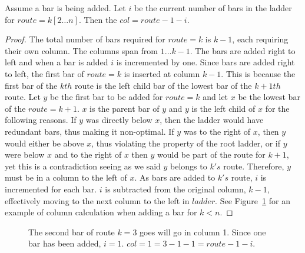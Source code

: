 \begin{lemma}
  Assume a bar is being added. Let $i$ be the current number of bars in the ladder for $route=k[2 \dots n]$.
  Then the $col=route-1-i$.
\end{lemma}
\begin{proof}
  The total number of bars required for $route=k$ is $k-1$, each requiring their own column. The columns 
  span from $1 \dots k-1$. The 
  bars are added right to left and when a bar is added $i$ is incremented by one. 
  Since bars are 
  added right to left, the first bar 
  of $route=k$ is inserted at column $k-1$. This is because the first bar of the $kth$ route is the left child bar of the 
  lowest bar of the $k+1th$ route. Let $y$ be the first bar to be added for $route=k$ and let $x$ be 
  the 
  lowest bar of the $route=k+1$. $x$ is the parent bar of $y$ and $y$ is the left child of 
  $x$ for the following reasons. If $y$ was directly below $x$, then the ladder would have redundant bars, thus making it 
  non-optimal. If $y$ was to the right of $x$, then $y$ would either be above $x$, thus violating the property of the root ladder, 
  or if $y$ were below $x$ and to the right of $x$ then $y$ would be part of the route for $k+1$, yet this is a contradiction 
  seeing as we said $y$ belongs to $k's$ route. Therefore, $y$ must be in a column to the left of $x$. As bars are added 
  to $k's$ route, $i$ is incremented for each bar. $i$ is subtracted from the original column, $k-1$, effectively moving 
  to the next column to the left in $ladder$. See Figure~\ref{Fig:SJTcase2} for an example of column calculation when adding a bar for $k<n$.
\end{proof}

\begin{figure}[!htp]
  \begin{center}
    
\end{center} 
\caption{The second bar of route $k=3$ goes will go in column 1. Since one bar has been added, $i=1$. $col=1=3-1-1=route-1-i$.}

\label{Fig:SJTcase2}
\end{figure}




